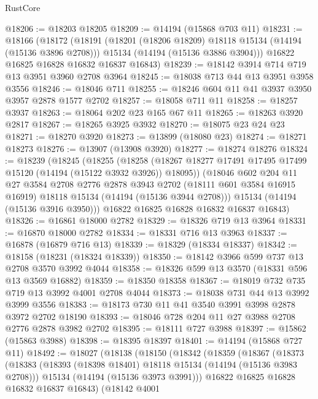 \begin{lexlean}{RustCore}
\begin{coremodule}
@18206 := @18203 @18205
@18209 := @14194 (@15868 @703 @11)
@18231 := @18166
    (@18172
      (@18191
        (@18201 (@18206 @18209) @18118 @15134 (@14194 (@15136 @3896 @2708)))
        @15134
        (@14194 (@15136 @3886 @3904)))
      @16822
      @16825
      @16828
      @16832
      @16837
      @16843)
@18239 := @18142 @3914 @714 @719 @13 @3951 @3960 @2708 @3964
@18245 := @18038 @713 @44 @13 @3951 @3958 @3556
@18246 := @18046 @711
@18255 := @18246 @604 @11 @41 @3937 @3950 @3957 @2878 @1577 @2702
@18257 := @18058 @711 @11
@18258 := @18257 @3937
@18263 := @18064 @202 @23 @165 @67 @11
@18265 := @18263 @3920 @2817
@18267 := @18265 @3925 @3932
@18270 := @18075 @23 @24 @23
@18271 := @18270 @3920
@18273 := @13899 (@18080 @23)
@18274 := @18271 @18273
@18276 := @13907 (@13908 @3920)
@18277 := @18274 @18276
@18324 := @18239
    (@18245
      (@18255
        (@18258 (@18267 @18277 @17491 @17495 @17499 @15120 (@14194 (@15122 @3932 @3926)) @18095))
        (@18046
          @602
          @204
          @11
          @27
          @3584
          @2708
          @2776
          @2878
          @3943
          @2702
          (@18111 @601 @3584 @16915 @16919)
          @18118
          @15134
          (@14194 (@15136 @3944 @2708)))
        @15134
        (@14194 (@15136 @3916 @3950)))
      @16822
      @16825
      @16828
      @16832
      @16837
      @16843)
@18326 := @16861 @18000 @2782
@18329 := @18326 @719 @13 @3964
@18331 := @16870 @18000 @2782
@18334 := @18331 @716 @13 @3963
@18337 := @16878 (@16879 @716 @13)
@18339 := @18329 (@18334 @18337)
@18342 := @18158 (@18231 (@18324 @18339))
@18350 := @18142 @3966 @599 @737 @13 @2708 @3570 @3992 @4044
@18358 := @18326 @599 @13 @3570 (@18331 @596 @13 @3569 @16882)
@18359 := @18350 @18358
@18367 := @18019 @732 @735 @719 @13 @3992 @4001 @2708 @4044
@18373 := @18038 @731 @44 @13 @3992 @3999 @3556
@18383 := @18173 @730 @11 @41 @3540 @3991 @3998 @2878 @3972 @2702 @18190
@18393 := @18046 @728 @204 @11 @27 @3988 @2708 @2776 @2878 @3982 @2702
@18395 := @18111 @727 @3988
@18397 := @15862 (@15863 @3988)
@18398 := @18395 @18397
@18401 := @14194 (@15868 @727 @11)
@18492 := @18027
    (@18138
      (@18150
        (@18342
          (@18359
            (@18367
              (@18373
                (@18383
                  (@18393 (@18398 @18401) @18118 @15134 (@14194 (@15136 @3983 @2708)))
                  @15134
                  (@14194 (@15136 @3973 @3991)))
                @16822
                @16825
                @16828
                @16832
                @16837
                @16843)
              (@18142
                @4001

\end{coremodule}
\end{lexlean}
